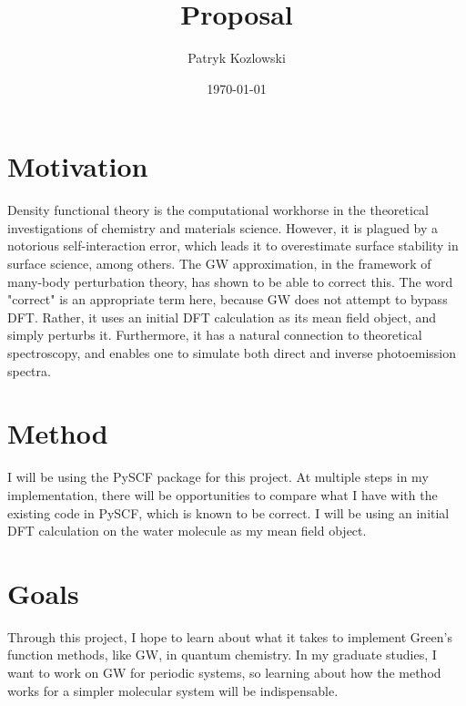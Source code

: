 \documentclass[12pt]{article}
\author{Patryk Kozlowski}
\title{Proposal}
\date{\today}
\begin{document}
\maketitle
\section{Motivation}
Density functional theory is the computational workhorse in the theoretical investigations of chemistry and materials science. However, it is plagued by a notorious self-interaction error, which leads it to overestimate surface stability in surface science, among others. \autocite{schimka_accurate_2010} The GW approximation, in the framework of many-body perturbation theory, has shown to be able to correct this. The word "correct" is an appropriate term here, because GW does not attempt to bypass DFT. Rather, it uses an initial DFT calculation as its mean field object, and simply perturbs it. Furthermore, it has a natural connection to theoretical spectroscopy, and enables one to simulate both direct and inverse photoemission spectra. \autocite{frontiers} 
\section{Method}
I will be using the PySCF package for this project. \autocite{noauthor_pyscf_nodate} At multiple steps in my implementation, there will be opportunities to compare what I have with the existing code in PySCF, which is known to be correct. I will be using an initial DFT calculation on the water molecule as my mean field object.
\section{Goals}
Through this project, I hope to learn about what it takes to implement Green's function methods, like GW, in quantum chemistry. In my graduate studies, I want to work on GW for periodic systems, so learning about how the method works for a simpler molecular system will be indispensable.
\printbibliography
\end{document}
